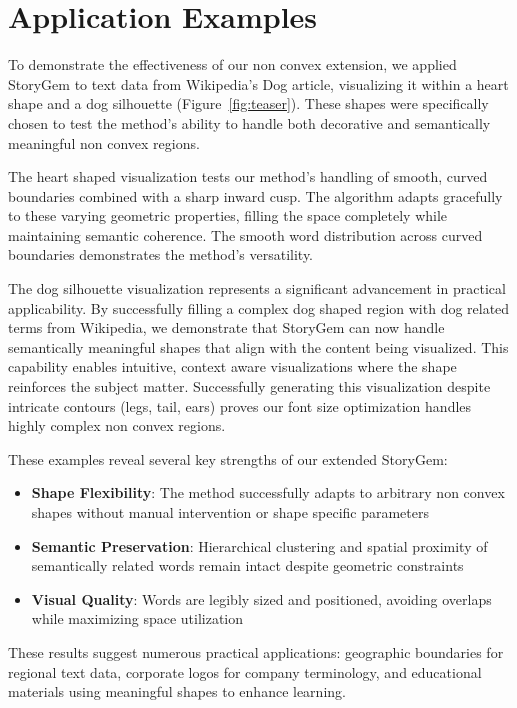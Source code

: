 \documentclass{vgtc}                          %
\begin{document}
\section{Application Examples}

To demonstrate the effectiveness of our non convex extension, we applied StoryGem to text data from Wikipedia's Dog article, visualizing it within a heart shape and a dog silhouette (Figure~\ref{fig:teaser}).
These shapes were specifically chosen to test the method's ability to handle both decorative and semantically meaningful non convex regions.

The heart shaped visualization tests our method's handling of smooth, curved boundaries combined with a sharp inward cusp.
The algorithm adapts gracefully to these varying geometric properties, filling the space completely while maintaining semantic coherence.
The smooth word distribution across curved boundaries demonstrates the method's versatility.

The dog silhouette visualization represents a significant advancement in practical applicability.
By successfully filling a complex dog shaped region with dog related terms from Wikipedia, we demonstrate that StoryGem can now handle semantically meaningful shapes that align with the content being visualized.
This capability enables intuitive, context aware visualizations where the shape reinforces the subject matter.
Successfully generating this visualization despite intricate contours (legs, tail, ears) proves our font size optimization handles highly complex non convex regions.

These examples reveal several key strengths of our extended StoryGem:
\begin{itemize}
  \item \textbf{Shape Flexibility}: The method successfully adapts to arbitrary non convex shapes without manual intervention or shape specific parameters
  \item \textbf{Semantic Preservation}: Hierarchical clustering and spatial proximity of semantically related words remain intact despite geometric constraints
  \item \textbf{Visual Quality}: Words are legibly sized and positioned, avoiding overlaps while maximizing space utilization
\end{itemize}

These results suggest numerous practical applications: geographic boundaries for regional text data, corporate logos for company terminology, and educational materials using meaningful shapes to enhance learning.
\end{document}
